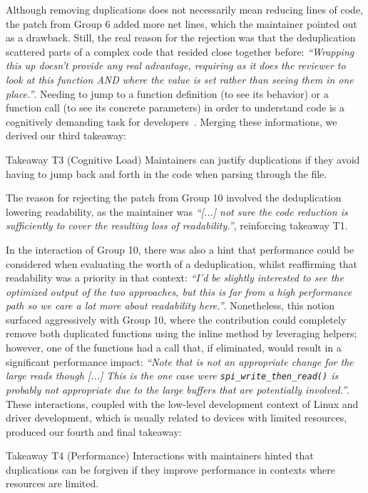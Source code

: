 \documentclass[10pt,conference]{IEEEtran}
\newenvironment{highlight-box}[1]{%
  \begin{tcolorbox}[colback=gray!10, colframe=gray!50!black, boxrule=0.5pt,
                    left=1mm, right=1mm, top=1mm, bottom=1mm, sharp corners]
  \textbf{#1:} \itshape}{\end{tcolorbox}}
\begin{document}
Although removing duplications does not necessarily mean reducing lines of code, the patch from Group 6 added more net lines, which the maintainer pointed out as a drawback. Still, the real reason for the rejection was that the deduplication scattered parts of a complex code that resided close together before: \textit{``Wrapping this up doesn't provide any real advantage, requiring as it does the reviewer to look at this function AND where the value is set rather than seeing them in one place.''}. Needing to jump to a function definition (to see its behavior) or a function call (to see its concrete parameters) in order to understand code is a cognitively demanding task for developers~\cite{questions-programmers-ask}. Merging these informations, we derived our third takeaway:

\begin{highlight-box}{Takeaway T3 (Cognitive Load)}
Maintainers can justify duplications if they avoid having to jump back and forth in the code when parsing through the file.
\end{highlight-box}

The reason for rejecting the patch from Group 10 involved the deduplication lowering readability, as the maintainer was \textit{``[...] not sure the code reduction is sufficiently to cover the resulting loss of readability.''}, reinforcing takeaway T1.

In the interaction of Group 10, there was also a hint that performance could be considered when evaluating the worth of a deduplication, whilst reaffirming that readability was a priority in that context: \textit{``I'd be slightly interested to see the optimized output of the two approaches, but this is far from a high performance path so we care a lot more about readability here.''}. Nonetheless, this notion surfaced aggressively with Group 10, where the contribution could completely remove both duplicated functions using the inline method by leveraging helpers; however, one of the functions had a call that, if eliminated, would result in a significant performance impact: \textit{``Note that is not an appropriate change for the large reads though [...] This is the one case were \texttt{spi\_write\_then\_read()} is probably not appropriate due to the large buffers that are potentially involved.''}. These interactions, coupled with the low-level development context of Linux and driver development, which is usually related to devices with limited resources, produced our fourth and final takeaway:

\begin{highlight-box}{Takeaway T4 (Performance)}
Interactions with maintainers hinted that duplications can be forgiven if they improve performance in contexts where resources are limited.
\end{highlight-box}
\end{document}
